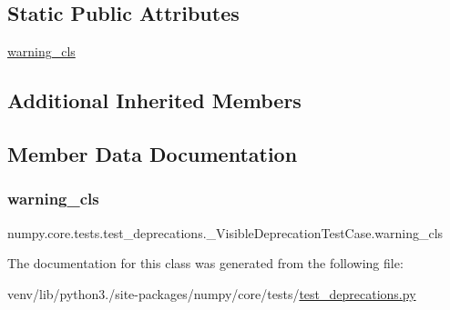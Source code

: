 \subsection*{Static Public Attributes}
\begin{DoxyCompactItemize}
\item 
\hyperlink{classnumpy_1_1core_1_1tests_1_1test__deprecations_1_1__VisibleDeprecationTestCase_a0afde7a7f5f5e4af23aa1590dabeab60}{warning\+\_\+cls}
\end{DoxyCompactItemize}
\subsection*{Additional Inherited Members}


\subsection{Member Data Documentation}
\mbox{\label{classnumpy_1_1core_1_1tests_1_1test__deprecations_1_1__VisibleDeprecationTestCase_a0afde7a7f5f5e4af23aa1590dabeab60}} 
\subsubsection{\texorpdfstring{warning\+\_\+cls}{warning\_cls}}
{\footnotesize\ttfamily numpy.\+core.\+tests.\+test\+\_\+deprecations.\+\_\+\+Visible\+Deprecation\+Test\+Case.\+warning\+\_\+cls\hspace{0.3cm}{\ttfamily [static]}}



The documentation for this class was generated from the following file\+:\begin{DoxyCompactItemize}
\item 
venv/lib/python3./site-\/packages/numpy/core/tests/\hyperlink{core_2tests_2test__deprecations_8py}{test\+\_\+deprecations.\+py}\end{DoxyCompactItemize}
